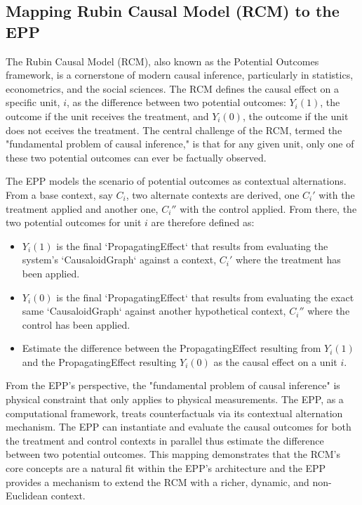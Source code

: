 %
%
\subsection{Mapping Rubin Causal Model (RCM) to the EPP}
\label{sec:epp_rubin_causal_model}

The Rubin Causal Model (RCM), also known as the Potential Outcomes framework, is a cornerstone of modern causal inference, particularly in statistics, econometrics, and the social sciences. The RCM defines the causal effect on a specific unit, $i$, as the difference between two potential outcomes: $Y_{i}(1)$, the outcome if the unit receives the treatment, and $Y_{i}(0)$,  the outcome if the unit does not eceives the treatment. The central challenge of the RCM, termed the "fundamental problem of causal inference," is that for any given unit, only one of these two potential outcomes can ever be factually observed.  

The EPP models the scenario of potential outcomes as contextual alternations. From a base context, say $C_i$, two alternate contexts are derived, one $C_i'$  with the treatment applied and another one,  $C_i''$ with the control applied. From there, the two potential outcomes for unit $i$ are therefore defined as:

\begin{itemize}
	\item  $Y_i(1)$ is the final `PropagatingEffect` that results from evaluating the system's `CausaloidGraph` against a context, $C_i'$ where the treatment has been applied.
	\item $Y_i(0)$ is the final `PropagatingEffect` that results from evaluating the exact same `CausaloidGraph` against another hypothetical context, $C_i''$ where the control has been applied.
	\item Estimate the difference between the PropagatingEffect resulting from $Y_i(1)$  and the PropagatingEffect resulting $Y_i(0)$ as the causal effect on a unit $i$. 
\end{itemize}

From the EPP's perspective, the "fundamental problem of causal inference" is physical constraint that only applies to physical measurements. The EPP, as a computational framework, treats counterfactuals via its contextual alternation mechanism. The EPP can instantiate and evaluate the causal outcomes for both the treatment and control contexts in parallel thus estimate the difference between two potential outcomes. This mapping demonstrates that the RCM's core concepts are a natural fit within the EPP's architecture and the EPP provides a mechanism to extend the RCM with a richer, dynamic, and non-Euclidean context.

